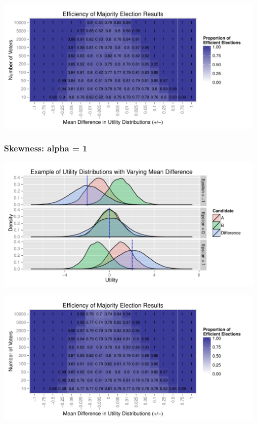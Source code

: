 \documentclass[12pt]{scrartcl}\usepackage[]{graphicx}\usepackage[]{color}
\makeatletter
\def\maxwidth{ %
  \ifdim\Gin@nat@width>\linewidth
    \linewidth
  \else
    \Gin@nat@width
  \fi
}
\newenvironment{knitrout}{}{} %
\makeatother
\begin{document}
\begin{knitrout}
\color{fgcolor}
\includegraphics[width=\maxwidth]{figure/unnamed-chunk-3} 

\end{knitrout}


\clearpage
\subsubsection{Skewness: alpha = 1}
\begin{knitrout}
\color{fgcolor}
\includegraphics[width=\maxwidth]{figure/unnamed-chunk-4} 

\end{knitrout}


\begin{knitrout}
\color{fgcolor}
\includegraphics[width=\maxwidth]{figure/unnamed-chunk-5} 

\end{knitrout}
\end{document}
